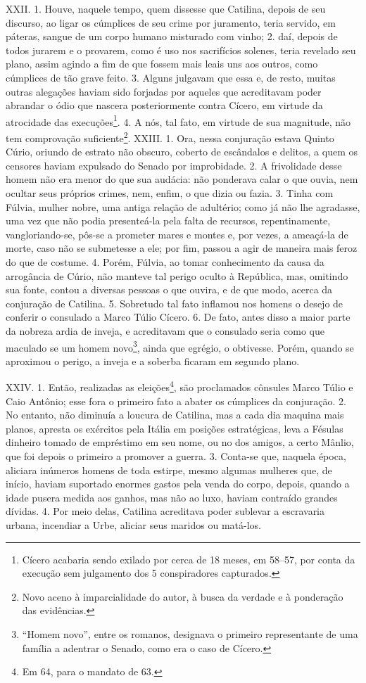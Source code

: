 XXII. 1. Houve, naquele tempo, quem dissesse que Catilina, depois de seu
discurso, ao ligar os cúmplices de seu crime por juramento, teria servido, em
páteras, sangue de um corpo humano misturado com vinho; 2. daí, depois de todos
jurarem e o provarem, como é uso nos sacrifícios solenes, teria revelado
seu plano, assim agindo a fim de que fossem mais leais uns aos outros, como
cúmplices de tão grave feito. 3. Alguns julgavam que essa e, de resto, muitas
outras alegações haviam sido forjadas por aqueles que acreditavam poder
abrandar o ódio que nascera posteriormente contra Cícero, em virtude da
atrocidade das execuções\footnote{Cícero acabaria sendo exilado por cerca de 18
meses, em 58--57, por conta da execução sem julgamento dos 5 conspiradores
capturados.}. 4. A nós, tal fato, em virtude de sua magnitude, não tem
comprovação suficiente\footnote{Novo aceno à imparcialidade do autor, à busca
da verdade e à ponderação das evidências.}.  XXIII. 1. Ora, nessa conjuração
estava Quinto Cúrio, oriundo de estrato não obscuro, coberto de escândalos e
delitos, a quem os censores haviam expulsado do Senado por improbidade. 2. A
frivolidade desse homem não era menor do que sua audácia: não ponderava calar o
que ouvia, nem ocultar seus próprios crimes, nem, enfim, o que dizia ou fazia.
3. Tinha com Fúlvia, mulher nobre, uma antiga relação de adultério; como já não lhe agradasse, uma vez que não podia presenteá-la pela falta de recursos,
repentinamente, vangloriando-se, pôs-se a prometer mares e montes e, por vezes,
a ameaçá-la de morte, caso não se submetesse a ele; por fim, passou a agir de
maneira mais feroz do que de costume. 4. Porém, Fúlvia, ao tomar conhecimento
da causa da arrogância de Cúrio, não manteve tal perigo oculto à República,
mas, omitindo sua fonte, contou a diversas pessoas o que ouvira, e de que modo,
acerca da conjuração de Catilina. 5. Sobretudo tal fato inflamou nos homens o
desejo de conferir o consulado a Marco Túlio Cícero. 6. De fato, antes disso a
maior parte da nobreza ardia de inveja, e acreditavam que o consulado seria
como que maculado se um homem novo\footnote{``Homem novo'', entre os romanos,
designava o primeiro representante de uma família a adentrar o Senado, como era
o caso de Cícero.}, ainda que egrégio, o obtivesse. Porém, quando se aproximou
o perigo, a inveja e a soberba ficaram em segundo plano.

XXIV. 1. Então, realizadas as eleições\footnote{Em 64, para o mandato de  63.},
são proclamados cônsules Marco Túlio e Caio Antônio; esse fora o primeiro fato
a abater os cúmplices da conjuração. 2. No entanto, não diminuía a loucura de
Catilina, mas a cada dia maquina mais planos, apresta os exércitos pela Itália
em posições estratégicas, leva a Fésulas dinheiro tomado de empréstimo em seu
nome, ou no dos amigos, a certo Mânlio, que foi depois o primeiro a promover a
guerra. 3. Conta-se que, naquela época, aliciara inúmeros homens de toda
estirpe, mesmo algumas mulheres que, de início, haviam suportado enormes gastos
pela venda do corpo, depois, quando a idade pusera medida aos ganhos, mas não
ao luxo, haviam contraído grandes dívidas. 4. Por meio delas, Catilina
acreditava poder sublevar a escravaria urbana, incendiar a Urbe, aliciar seus
maridos ou matá-los.

